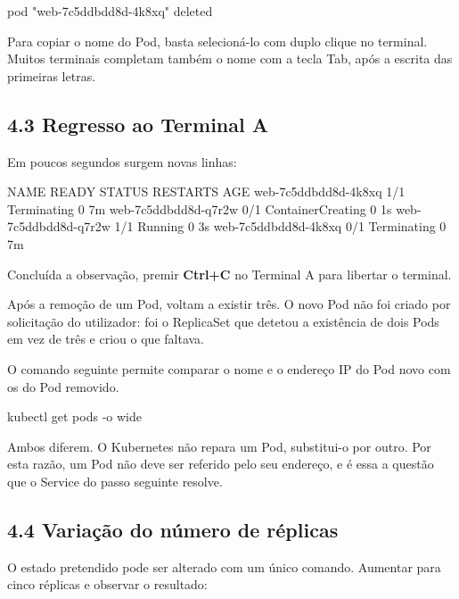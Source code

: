 \documentclass[11pt,a4paper]{article}
\begin{document}
\begin{saida}
pod "web-7c5ddbdd8d-4k8xq" deleted
\end{saida}

\begin{nota}
Para copiar o nome do Pod, basta selecioná-lo com duplo clique no terminal. Muitos terminais completam também o nome com a tecla Tab, após a escrita das primeiras letras.
\end{nota}

\subsection*{4.3 Regresso ao Terminal A}

Em poucos segundos surgem novas linhas:

\begin{saida}
NAME                   READY   STATUS              RESTARTS   AGE
web-7c5ddbdd8d-4k8xq   1/1     Terminating         0          7m
web-7c5ddbdd8d-q7r2w   0/1     ContainerCreating   0          1s
web-7c5ddbdd8d-q7r2w   1/1     Running             0          3s
web-7c5ddbdd8d-4k8xq   0/1     Terminating         0          7m
\end{saida}

Concluída a observação, premir \textbf{Ctrl+C} no Terminal A para libertar o terminal.

\begin{observe}
Após a remoção de um Pod, voltam a existir três. O novo Pod não foi criado por solicitação do utilizador: foi o ReplicaSet que detetou a existência de dois Pods em vez de três e criou o que faltava.

O comando seguinte permite comparar o nome e o endereço IP do Pod novo com os do Pod removido.
\end{observe}

\begin{terminal}
kubectl get pods -o wide
\end{terminal}

Ambos diferem. O Kubernetes não repara um Pod, substitui-o por outro. Por esta razão, um Pod não deve ser referido pelo seu endereço, e é essa a questão que o Service do passo seguinte resolve.

\subsection*{4.4 Variação do número de réplicas}

O estado pretendido pode ser alterado com um único comando. Aumentar para cinco réplicas e observar o resultado:
\end{document}
